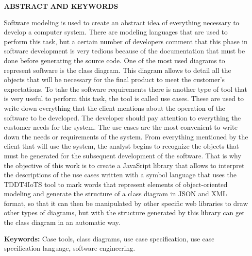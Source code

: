 \begin{center}
	{\titulodc \textbf{ABSTRACT AND KEYWORDS}}
\end{center}

Software modeling is used to create an abstract idea of everything necessary to develop a computer system. There are modeling languages that are used to perform this task, but a certain number of developers comment that this phase in software development is very tedious because of the documentation that must be done before generating the source code. One of the most used diagrams to represent software is the class diagram. This diagram allows to detail all the objects that will be necessary for the final product to meet the customer's expectations. To take the software requirements there is another type of tool that is very useful to perform this task, the tool is called use cases. These are used to write down everything that the client mentions about the operation of the software to be developed. The developer should pay attention to everything the customer needs for the system. The use cases are the most convenient to write down the needs or requirements of the system. From everything mentioned by the client that will use the system, the analyst begins to recognize the objects that must be generated for the subsequent development of the software. That is why the objective of this work is to create a JavaSript library that allows to interpret the descriptions of the use cases written with a symbol language that uses the TDDT4IoTS tool to mark words that represent elements of object-oriented modeling and generate the structure of a class diagram in JSON and XML format, so that it can then be manipulated by other specific web libraries to draw other types of diagrams, but with the structure generated by this library can get the class diagram in an automatic way.  

\textbf{Keywords:} Case tools, class diagrams, use case specification, use case specification language, software engineering.